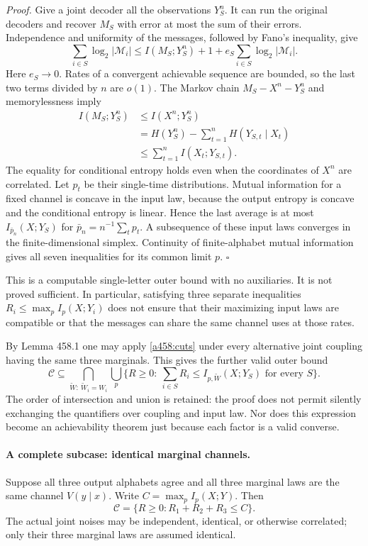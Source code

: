 \documentclass[11pt]{article}
\begin{document}
\emph{Proof.} Give a joint decoder all the observations $Y_S^n$.
It can run the original decoders and recover $M_S$ with error at most
the sum of their errors. Independence and uniformity of the messages,
followed by Fano's inequality, give
\[
 \sum_{i\in S}\log_2|\mathcal M_i|
 \le I(M_S;Y_S^n)+1+e_S\sum_{i\in S}\log_2|\mathcal M_i|.
\]
Here $e_S\to0$. Rates of a convergent achievable sequence are bounded,
so the last two terms divided by $n$ are $o(1)$. The Markov chain
$M_S-X^n-Y_S^n$ and memorylessness imply
\begin{align*}
 I(M_S;Y_S^n)&\le I(X^n;Y_S^n)\\
 &=H(Y_S^n)-\sum_{t=1}^nH(Y_{S,t}\mid X_t)\\
 &\le\sum_{t=1}^n I(X_t;Y_{S,t}).
\end{align*}
The equality for conditional entropy holds even when the coordinates of
$X^n$ are correlated. Let $p_t$ be their single-time distributions.
Mutual information for a fixed channel is concave in the input law,
because the output entropy is concave and the conditional entropy is
linear. Hence the last average is at most $I_{\bar p_n}(X;Y_S)$ for
$\bar p_n=n^{-1}\sum_tp_t$. A subsequence of these input laws converges
in the finite-dimensional simplex. Continuity of finite-alphabet mutual
information gives all seven inequalities for its common limit $p$.
\hfill$\square$

This is a computable single-letter outer bound with no auxiliaries. It
is not proved sufficient. In particular, satisfying three separate
inequalities $R_i\le\max_p I_p(X;Y_i)$ does not ensure that their
maximizing input laws are compatible or that the messages can share the
same channel uses at those rates.

By Lemma 458.1 one may apply \eqref{a458:cuts} under every alternative
joint coupling having the same three marginals. This gives the further
valid outer bound
\[
 \mathcal C\subseteq
 \bigcap_{\widetilde W:\ \widetilde W_i=W_i}
 \bigcup_p\{R\ge0:\ \sum_{i\in S}R_i
                  \le I_{p,\widetilde W}(X;Y_S)\text{ for every }S\}.
\]
The order of intersection and union is retained: the proof does not
permit silently exchanging the quantifiers over coupling and input law.
Nor does this expression become an achievability theorem just because
each factor is a valid converse.

\paragraph{A complete subcase: identical marginal channels.}
Suppose all three output alphabets agree and all three marginal laws
are the same channel $V(y\mid x)$. Write
$C=\max_p I_p(X;Y)$. Then
\begin{equation}\label{a458:identical}
 \mathcal C=\{R\ge0:R_1+R_2+R_3\le C\}.
\end{equation}
The actual joint noises may be independent, identical, or otherwise
correlated; only their three marginal laws are assumed identical.
\end{document}
